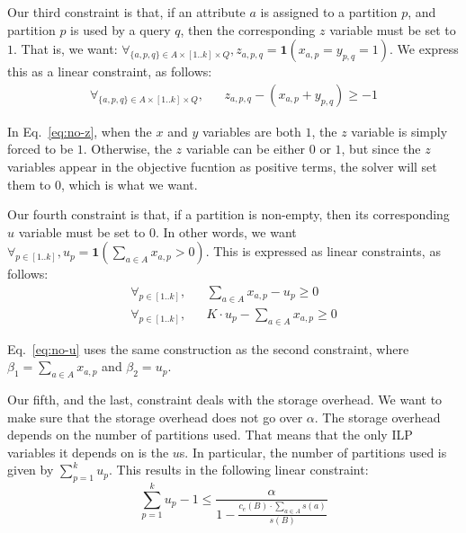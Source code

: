 Our third constraint is that, if an attribute $a$ is assigned to a partition
$p$, and partition $p$ is used by a query $q$, then the corresponding $z$
variable must be set to $1$. That is, we want: $\forall_{\{a,p,q\}\in A\times
[1..k]\times Q}, z_{a,p,q}=\mathbf{1}(x_{a,p} = y_{p,q} = 1)$. We express this
as a linear  constraint, as follows:
\begin{eqnarray}
\forall_{\{a,p,q\}\in A\times [1..k]\times Q},
    && z_{a,p,q} - (x_{a,p} + y_{p,q}) \geq -1\label{eq:no-z}
\end{eqnarray}

In Eq.~\ref{eq:no-z}, when the $x$ and $y$ variables are both $1$, the  $z$
variable is simply forced to be $1$. Otherwise, the $z$ variable can be either
$0$ or $1$, but since the $z$ variables appear in the objective fucntion as
positive terms, the solver will set them to $0$, which is what we want. 

Our fourth constraint is that, if a partition is non-empty, then its
corresponding $u$ variable must be set to $0$. In other words,  we want
$\forall_{p\in[1..k]}, u_p = \mathbf{1}(\sum_{a\in A} x_{a,p}>0)$. This is
expressed as linear constraints, as follows:
\begin{eqnarray}
\forall_{p\in[1..k]},
    && \sum_{a\in A} x_{a,p} - u_p \geq 0 \nonumber\\
\forall_{p\in[1..k]},
    && K\cdot u_p - \sum_{a\in A} x_{a,p} \geq 0 \label{eq:no-u}
\end{eqnarray}

Eq.~\ref{eq:no-u} uses the same construction as the second constraint, where
$\beta_1=\sum_{a\in A} x_{a,p}$ and $\beta_2=u_p$.

Our fifth, and the last, constraint deals with the storage overhead. We want to
 make sure that the storage overhead does not go over $\alpha$. The storage
overhead depends on the number of partitions used. That means that the only 
ILP variables it depends on is the $u$s. In particular, the number of
partitions used is given by $\sum_{p=1}^{k} u_p$. This results in the
following linear constraint:
\begin{equation}
\sum_{p=1}^{k} u_p - 1 \leq \frac{\alpha}
  {1-\frac{c_e(B)\cdot \sum_{a\in A} s(a)}{s(B)}}
\end{equation}


